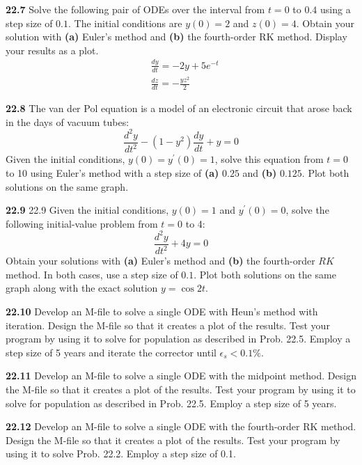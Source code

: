 \begin{multicols}{2}
    \noindent\textbf{22.7} Solve the following pair of ODEs over the interval from $t=0$ to $0.4$ using a step size of $0.1$. The initial conditions are $y(0)=2$ and $z(0)=4$. Obtain your solution with \textbf{(a)} Euler's method and \textbf{(b)} the fourth-order RK method. Display your results as a plot.
    $$
    \begin{aligned}
    &\frac{d y}{d t}=-2 y+5 e^{-t} \\
    &\frac{d z}{d t}=-\frac{y z^{2}}{2}
    \end{aligned}
    $$\vspace{2mm}

    \noindent\textbf{22.8} The van der Pol equation is a model of an electronic circuit that arose back in the days of vacuum tubes:
    $$
    \frac{d^{2} y}{d t^{2}}-\left(1-y^{2}\right) \frac{d y}{d t}+y=0
    $$
    Given the initial conditions, $y(0)=y^{\prime}(0)=1$, solve this equation from $t=0$ to 10 using Euler's method with a step size of \textbf{(a)} $0.25$ and \textbf{(b)} $0.125$. Plot both solutions on the same graph.\vspace{2mm}

    \noindent\textbf{22.9} 22.9 Given the initial conditions, $y(0)=1$ and $y^{\prime}(0)=0$, solve the following initial-value problem from $t=0$ to 4:
    $$
    \frac{d^{2} y}{d t^{2}}+4 y=0
    $$ Obtain your solutions with \textbf{(a)} Euler's method and \textbf{(b)} the fourth-order $R K$ method. In both cases, use a step size of $0.1$. Plot both solutions on the same graph along with the exact solution $y=\cos 2 t$.\vspace{2mm}

    \noindent\textbf{22.10} Develop an M-file to solve a single ODE with Heun's
    method with iteration. Design the M-file so that it creates a
    plot of the results. Test your program by using it to solve for
    population as described in Prob. 22.5. Employ a step size of
    5 years and iterate the corrector until $\epsilon_s < 0.1\%$.\vspace{2mm}

    \noindent\textbf{22.11} Develop an M-file to solve a single ODE with the
    midpoint method. Design the M-file so that it creates a plot
    of the results. Test your program by using it to solve for population as described in Prob. 22.5. Employ a step size of
    5 years.\vspace{2mm}

    \noindent\textbf{22.12} Develop an M-file to solve a single ODE with the
    fourth-order RK method. Design the M-file so that it creates
    a plot of the results. Test your program by using it to solve
    Prob. 22.2. Employ a step size of 0.1.\vspace{2mm}


\end{multicols}
